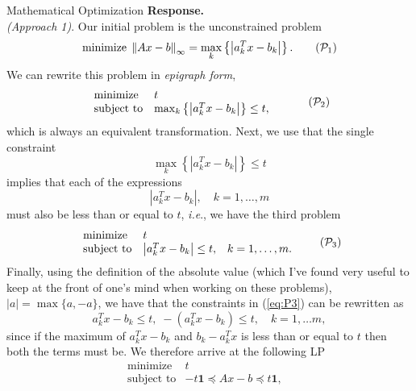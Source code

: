 \begin{chapter}{Mathematical Optimization}
    \vspace{0.1cm}
    \noindent\textbf{Response.} \\
    \noindent \textit{(Approach 1)}. Our initial problem is the unconstrained problem
    \begin{equation}\text{minimize} \; \left\lVert Ax - b \right\rVert_{\infty} = \max_k \left\{ \left| a_k^Tx - b_k \right| \right\}.
    \tag{$\mathcal{P}_1$}
    \label{eq:P1}
    \end{equation}
    We can rewrite this problem in \textit{epigraph form}, 
    \begin{equation}\begin{array}{lll}
    \text{minimize} \; & t & \\
    \text{subject to} & \max_k \left\{ \left| a_k^Tx - b_k \right| \right\} \le t,
    \end{array}
    \tag{$\mathcal{P}_2$}
    \label{eq:P2}
    \end{equation}
    which is always an equivalent transformation. Next, we use that the single constraint
    \[\max_k \left\{ \left| a_k^Tx - b_k \right| \right\} \le t\] implies that 
    each of the expressions
    \[\left| a_k^Tx - b_k \right|, \quad k = 1, \ldots, m\]
    must also be less than or equal to $t$, \textit{i.e}., we have the third problem
    \begin{equation}
        \begin{array}{lll}
            \text{minimize} \; & t & \\
            \text{subject to} & \left| a_k^Tx - b_k \right| \le t, & k = 1, \ldots, m.
            \end{array}
            \tag{$\mathcal{P}_3$}
            \label{eq:P3}
    \end{equation}
    Finally, using the definition of the absolute value (which I've found very useful to 
    keep at the front of one's mind when working on these problems), $\left| a \right| = \max \{a, -a\}$,
    we have that the constraints in (\ref{eq:P3}) can be rewritten as
    \[a_k^Tx - b_k \le t, \; -(a_k^Tx - b_k) \le t, \quad k = 1, \ldots m,\]
    since if the maximum of $a_k^Tx  - b_k$ and $b_k - a^T_kx$ is less than or equal to $t$ then
    both the terms must be. We therefore arrive at the following LP
    \begin{equation}
        \begin{array}{lll}
            \text{minimize} \; & t & \\
            \text{subject to} & -t \bm{1} \preceq Ax - b \preceq t \bm{1},

\end{array}
\end{equation}
\end{chapter}
